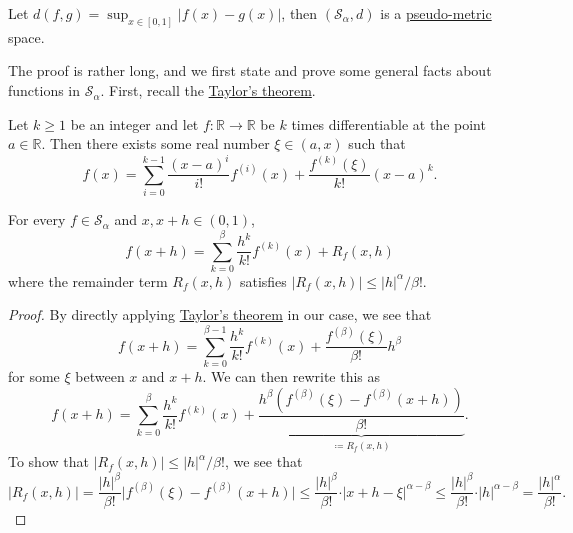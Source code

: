 \begin{prev}
	Let \(d(f, g) = \sup _{x\in [0, 1]} \vert f(x) - g(x) \vert \), then \((\mathcal{S} _\alpha , d)\) is a \hyperref[def:pseudo-metric]{pseudo-metric} space.
\end{prev}

The proof is rather long, and we first state and prove some general facts about functions in \(\mathcal{S} _\alpha \). First, recall the \hyperref[thm:Taylor]{Taylor's theorem}.
\begin{theorem}\label{thm:Taylor}
	Let \(k \geq 1\) be an integer and let \(f\colon \mathbb{R} \to \mathbb{R} \) be \(k\) times differentiable at the point \(a\in \mathbb{R} \). Then there exists some real number \(\xi \in (a, x)\) such that
	\[
		f(x) = \sum_{i=0}^{k-1} \frac{(x-a)^i}{i!} f^{(i)}(x) + \frac{f^{(k)}(\xi )}{k!} (x-a)^k.
	\]
\end{theorem}

\begin{lemma}\label{lma:Holder-smooth-1}
	For every \(f\in \mathcal{S} _\alpha \) and \(x, x+h \in (0, 1)\),
	\[
		f(x+h) = \sum_{k=0}^{\beta } \frac{h^k}{k!} f^{(k)}(x) + R_f(x, h)
	\]
	where the remainder term \(R_f(x, h)\) satisfies \(\vert R_f (x, h) \vert \leq \vert h \vert ^\alpha / \beta !\).
\end{lemma}
\begin{proof}
	By directly applying \hyperref[thm:Taylor]{Taylor's theorem} in our case, we see that
	\[
		f(x+h) = \sum_{k=0}^{\beta -1} \frac{h^k}{k!}f^{(k)}(x) + \frac{f^{(\beta )}(\xi )}{\beta !} h^\beta
	\]
	for some \(\xi\) between \(x\) and \(x+h\). We can then rewrite this as
	\[
		f(x+h) = \sum_{k=0}^{\beta } \frac{h^k}{k!}f^{(k)}(x) + \underbrace{\frac{h^\beta (f^{(\beta )}(\xi ) - f^{(\beta )}(x+h) )}{\beta !}}_{\coloneqq R_f(x, h)}.
	\]
	To show that \(\vert R_f(x, h) \vert \leq \vert h \vert ^\alpha / \beta !\), we see that
	\[
		\vert R_f(x, h) \vert
		= \frac{\vert h \vert ^\beta }{\beta !} \vert f^{(\beta )}(\xi ) - f^{(\beta )}(x+h) \vert
		\leq \frac{\vert h \vert ^\beta }{\beta !}\cdot \vert x+h - \xi \vert ^{\alpha - \beta }
		\leq \frac{\vert h \vert ^\beta }{\beta !}\cdot \vert h \vert ^{\alpha - \beta }
		= \frac{\vert h \vert ^\alpha }{\beta !}.
	\]
\end{proof}


